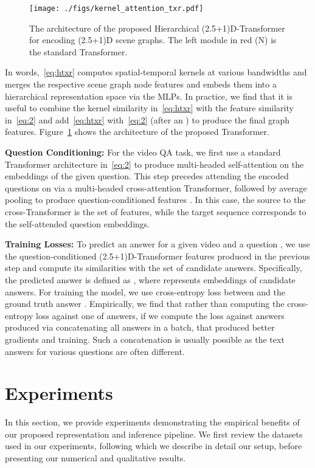 \documentclass[letterpaper]{article} \usepackage{aaai22}  \usepackage{times}  \usepackage{helvet}  \usepackage{courier}  \usepackage[hyphens]{url}  \usepackage{graphicx} \urlstyle{rm} \def\UrlFont{\rm}  \usepackage{natbib}  \usepackage{caption} \DeclareCaptionStyle{ruled}{labelfont=normalfont,labelsep=colon,strut=off} \frenchspacing  \setlength{\pdfpagewidth}{8.5in}  \setlength{\pdfpageheight}{11in}  \usepackage{algorithm}
\newcommand{\name}{(2.5+1)D\xspace}
\newcommand{\nameTxr}{(2.5+1)D-Transformer\xspace}
\begin{document}
\begin{figure}
    \centering
    \texttt{[image: ./figs/kernel\_attention\_txr.pdf]}
    \caption{The architecture of the proposed Hierarchical \nameTxr for encoding \name scene graphs. The left module in red (N) is the standard Transformer. }
    \label{fig:h3.5d_txr}
    \vspace*{-0.5cm}
\end{figure}
In words,~\eqref{eq:htxr} computes spatial-temporal kernels at various bandwidths and merges the respective scene graph node features and embeds them into a hierarchical representation space via the MLPs. In practice, we find that it is useful to combine the kernel similarity in~\eqref{eq:htxr} with the feature similarity in~\eqref{eq:2} and add~\eqref{eq:htxr} with~\eqref{eq:2} (after an ) to produce the final graph features. Figure~\ref{fig:h3.5d_txr} shows the architecture of the proposed Transformer.

\noindent\textbf{Question Conditioning:}
For the video QA task, we first use a standard Transformer architecture in~\eqref{eq:2} to produce multi-headed self-attention on the embeddings of the given question. This step precedes attending the encoded questions on  via a multi-headed cross-attention Transformer, followed by average pooling to produce question-conditioned features . In this case, the source to the cross-Transformer is the set of  features, while the target sequence corresponds to the self-attended question embeddings. 

\noindent\textbf{Training Losses:}
To predict an answer  for a given video  and a question , we use the question-conditioned \nameTxr features produced in the previous step and compute its similarities with the set of candidate answers. Specifically, the predicted answer is defined as , where  represents embeddings of candidate answers. For training the model, we use cross-entropy loss between  and the ground truth answer . Empirically, we find that rather than computing the cross-entropy loss against one of  answers, if we compute the loss against  answers produced via concatenating all answers in a batch, that produced better gradients and training. Such a concatenation is usually possible as the text answers for various questions are often different.

\section{Experiments}
In this section, we provide experiments demonstrating the empirical benefits of our proposed representation and inference pipeline. We first review the datasets used in our experiments, following which we describe in detail our setup, before presenting our numerical and qualitative results.
\end{document}
